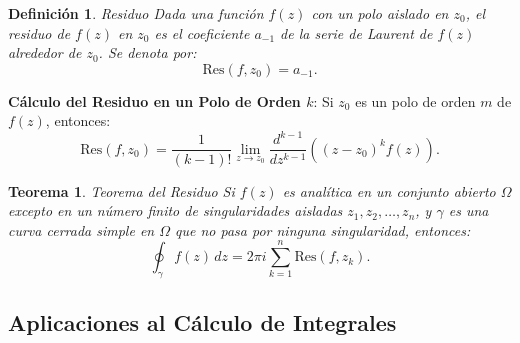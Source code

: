 \documentclass[letterpaper]{book}
\newtheorem{teorema}{Teorema}[section]
\newtheorem{def.}{Definici\'on}[section]
\newcommand{\om}{\ensuremath{\Omega}}
\begin{document}
\begin{def.}{Residuo}
Dada una función \(f(z)\) con un polo aislado en \(z_0\), el \emph{residuo} de \(f(z)\) en \(z_0\) es el coeficiente \(a_{-1}\) de la serie de Laurent de \(f(z)\) alrededor de \(z_0\). Se denota por:
\[
\text{Res}(f, z_0) = a_{-1}.
\]
\end{def.}
\noindent\textbf{Cálculo del Residuo en un Polo de Orden \(k\)}:
Si \(z_0\) es un polo de orden \(m\) de \(f(z)\), entonces:
\[
\text{Res}(f, z_0) = \frac{1}{(k-1)!} \lim_{z \to z_0} \frac{d^{k-1}}{dz^{k-1}} \left( (z - z_0)^k f(z) \right).
\]

\begin{teorema}{Teorema del Residuo}
Si \(f(z)\) es analítica en un conjunto abierto \(\om\) excepto en un número finito de singularidades aisladas \(z_1, z_2, \dots, z_n\), y \(\gamma\) es una curva cerrada simple en \(\om\) que no pasa por ninguna singularidad, entonces:
\[
\oint_\gamma f(z) \, dz = 2\pi i \sum_{k=1}^n \text{Res}(f, z_k).
\]
\end{teorema}

\subsection{Aplicaciones al Cálculo de Integrales}
\end{document}
